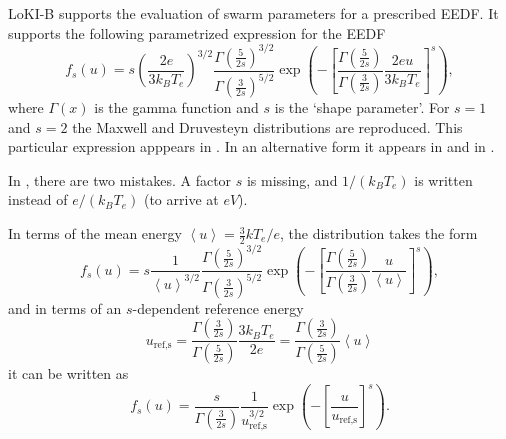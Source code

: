 \documentclass{book}
\newcommand{\MEAN}[1]{\ensuremath{\!\left\langle{{#1}}\right\rangle}}
\begin{document}
LoKI-B supports the evaluation of swarm parameters for a prescribed EEDF. It
supports the following parametrized expression for the EEDF
\begin{equation}
	f_s(u) = s\left(\frac{2e}{3k_BT_e}\right)^{3/2}
	\frac{\Gamma\left(\frac{5}{2s}\right)^{3/2}}{\Gamma\left(\frac{3}{2s}\right)^{5/2}}
	\exp\left(-\left[
		\frac{\Gamma\left(\frac{5}{2s}\right)}{\Gamma\left(\frac{3}{2s}\right)}
		\frac{2eu}{3k_BT_e}
	\right]^s\right),
	\label{eq:eedf-prescribed}
\end{equation}
where $\Gamma(x)$ is the gamma function and $s$ is the `shape parameter'. For
$s=1$ and $s=2$ the Maxwell and Druvesteyn distributions are reproduced.
This particular expression apppears in \cite[eq. 3]{Nam2008}. In an alternative
form it appears in \cite[eq. 13]{Amemiya1997} and in \cite[eq. 1]{Gudmundsson2001}.
\begin{framed}
	In \cite[eq. 22]{Manual_2_2_0}, there are two mistakes. A factor $s$ is missing,
	and $1/(k_BT_e)$ is written instead of $e/(k_BT_e)$ (to arrive at $\si{eV}$).
\end{framed}
In terms of the mean energy $\MEAN{u}=\frac{3}{2}kT_e/e$, the distribution takes the form
\begin{equation}
	f_s(u) = s\frac{1}{\MEAN{u}^{3/2}}
	\frac{\Gamma\left(\frac{5}{2s}\right)^{3/2}}{\Gamma\left(\frac{3}{2s}\right)^{5/2}}
	\exp\left(-\left[
		\frac{\Gamma\left(\frac{5}{2s}\right)}{\Gamma\left(\frac{3}{2s}\right)}
		\frac{u}{\MEAN{u}}
	\right]^s\right),
	\label{eq:eedf-prescribed-meanu}
\end{equation}
and in terms of an $s$-dependent reference energy
\begin{equation}
	u_{\text{ref,s}}
	= \frac{\Gamma\left(\frac{3}{2s}\right)}{\Gamma\left(\frac{5}{2s}\right)}\frac{3k_BT_e}{2e}
	= \frac{\Gamma\left(\frac{3}{2s}\right)}{\Gamma\left(\frac{5}{2s}\right)}\MEAN{u}
\end{equation}
it can be written as
\begin{equation}
	f_s(u)
	= \frac{s}{\Gamma\left(\frac{3}{2s}\right)}
	\frac{1}{u_{\text{ref,s}}^{3/2}}
	\exp\left(-\left[\frac{u}{u_{\text{ref,s}}}\right]^s\right).
\end{equation}
\end{document}
